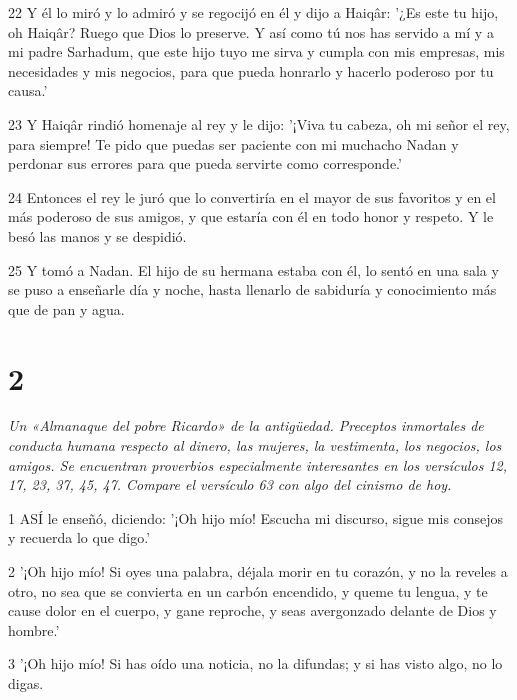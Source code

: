 \par 22 Y él lo miró y lo admiró y se regocijó en él y dijo a Haiqâr: '¿Es este tu hijo, oh Haiqâr? Ruego que Dios lo preserve. Y así como tú nos has servido a mí y a mi padre Sarhadum, que este hijo tuyo me sirva y cumpla con mis empresas, mis necesidades y mis negocios, para que pueda honrarlo y hacerlo poderoso por tu causa.'

\par 23 Y Haiqâr rindió homenaje al rey y le dijo: '¡Viva tu cabeza, oh mi señor el rey, para siempre! Te pido que puedas ser paciente con mi muchacho Nadan y perdonar sus errores para que pueda servirte como corresponde.'

\par 24 Entonces el rey le juró que lo convertiría en el mayor de sus favoritos y en el más poderoso de sus amigos, y que estaría con él en todo honor y respeto. Y le besó las manos y se despidió.

\par 25 Y tomó a Nadan. El hijo de su hermana estaba con él, lo sentó en una sala y se puso a enseñarle día y noche, hasta llenarlo de sabiduría y conocimiento más que de pan y agua.



\chapter{2}

\par \textit{Un «Almanaque del pobre Ricardo» de la antigüedad. Preceptos inmortales de conducta humana respecto al dinero, las mujeres, la vestimenta, los negocios, los amigos. Se encuentran proverbios especialmente interesantes en los versículos 12, 17, 23, 37, 45, 47. Compare el versículo 63 con algo del cinismo de hoy.}

\par 1 ASÍ le enseñó, diciendo: '¡Oh hijo mío! Escucha mi discurso, sigue mis consejos y recuerda lo que digo.'

\par 2 '¡Oh hijo mío! Si oyes una palabra, déjala morir en tu corazón, y no la reveles a otro, no sea que se convierta en un carbón encendido, y queme tu lengua, y te cause dolor en el cuerpo, y gane reproche, y seas avergonzado delante de Dios y hombre.'

\par 3 '¡Oh hijo mío! Si has oído una noticia, no la difundas; y si has visto algo, no lo digas.

